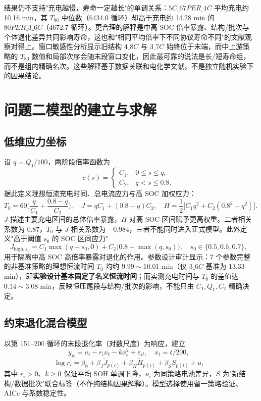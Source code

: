 \documentclass[withoutpreface,bwprint]{cumcmthesis}
\begin{document}
结果仍不支持"充电越慢，寿命一定越长"的单调关系：$5C\_67PER\_4C$ 平均充电约 10.16 min，其 $T_{80}$ 中位数（6434.0 循环）却高于充电约 14.28 min 的 $80PER\_3\_6C$（4672.7 循环）。更合理的解释是中高 SOC 倍率暴露、结构/批次与个体退化差异共同影响寿命，这也和"相同平均倍率下不同协议寿命不同"的文献观察对得上。窗口敏感性分析显示旧结构 $4\_8C$ 与 $3\_7C$ 始终位于末端，而中上游策略的 $T_{80}$ 数值和局部次序会随末段窗口变化，因此最可靠的说法是长/短寿命组，而不是组内精确名次。这些解释基于数据关联和电化学文献，不是独立随机实验下的因果结论。

\section{问题二模型的建立与求解}
\subsection{低维应力坐标}
设 $q=Q_1/100$，两阶段倍率函数为
\begin{equation}
c(s)=\begin{cases}C_1,&0\le s\le q,\\ C_2,&q<s\le0.8,\end{cases}
\end{equation}
据此定义理想恒流充电时间、总电流应力与高 SOC 加权应力：
\begin{equation}
T_0=60\Big(\frac{q}{C_1}+\frac{0.8-q}{C_2}\Big),\quad
J=qC_1+(0.8-q)C_2,\quad
H=\frac12\Big[C_1q^2+C_2(0.8^2-q^2)\Big].
\end{equation}
$J$ 描述主要充电区间的总体倍率暴露，$H$ 对高 SOC 区间赋予更高权重。二者相关系数为 $0.87$，$T_0$ 与 $J$ 相关系数为 $-0.984$，三者不能同时进入正式模型。此外定义"高于阈值 $s_0$ 的 SOC 区间应力"
\begin{equation}
J_{\mathrm{high},s_0}=C_1\max(q-s_0,0)+C_2\big(0.8-\max(q,s_0)\big),\quad s_0\in\{0.5,0.6,0.7\},
\end{equation}
用于隔离中高 SOC 高倍率暴露对退化的作用。参数设计审计显示：7 个参数完整的非基准策略的理想恒流时间 $T_0$ 均约 $9.99\sim10.01$ min（仅 $3\_6C$ 基准为 $13.33$ min），即\textbf{实验设计基本固定了名义恒流时间}；而实测充电时间与 $T_0$ 的差值达 $0.14\sim3.08$ min，反映恒压尾段与结构/批次的影响，不能只由 $C_1,Q_1,C_2$ 精确决定。

\subsection{约束退化混合模型}
以第 151--200 循环的末段退化率（对数尺度）为响应，建立
\begin{equation}
y_{it}=a_i-r_i x_t-kx_t^2+\varepsilon_{it},\quad x_t=t/200,
\end{equation}
\begin{equation}
\boxed{\log r_i=\beta_0+\beta_J\widetilde J_{p(i)}+\beta_H\widetilde H_{p(i)}+\beta_S S_{p(i)}+u_i}
\end{equation}
其中 $r_i>0$、$k\ge0$ 保证平均 SOH 单调下降，$u_i$ 为同策略电池差异，$S$ 为"新结构/数据批次"联合标签（不作纯结构因果解释）。模型选择使用留一策略验证、AICc 与系数稳定性。
\end{document}
